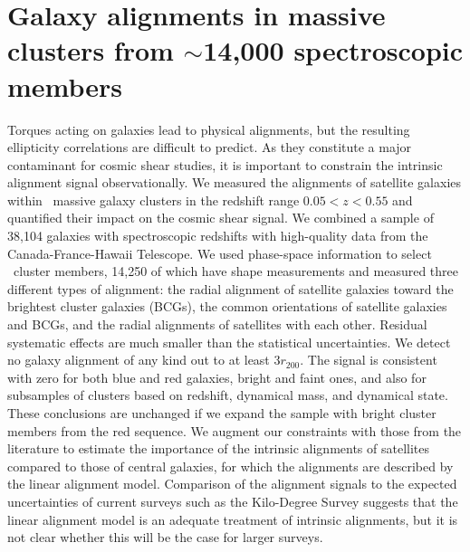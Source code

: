 \chapter{Galaxy alignments in massive clusters from $\sim$14,000 spectroscopic members}
\label{chapter:alignments}

\begin{small}
Torques acting on galaxies lead to physical alignments, but the resulting ellipticity correlations 
are difficult to  predict. As they constitute a major contaminant for cosmic shear studies, it is 
important to constrain the intrinsic alignment signal observationally. We measured the alignments 
of satellite galaxies within \Ncl\  massive galaxy clusters in the redshift range $0.05<z<0.55$ and 
quantified their impact on the cosmic shear signal. We combined a sample of 38,104 galaxies with 
spectroscopic redshifts with high-quality data from the Canada-France-Hawaii Telescope. We used 
phase-space information to select \Nmembers\ cluster members, 14,250 of which have shape 
measurements and measured three different types of alignment: the radial alignment of satellite 
galaxies toward the brightest cluster galaxies (BCGs), the common orientations of satellite 
galaxies and BCGs, and the radial alignments of satellites with each other. Residual systematic 
effects are much smaller than the statistical uncertainties. We detect no galaxy alignment of any 
kind out to at least $3r_{200}$. The signal is consistent with zero for both blue and red galaxies, 
bright and faint ones, and also for subsamples of clusters based on redshift, dynamical mass, and 
dynamical state. These conclusions are unchanged if we expand the sample with bright cluster 
members from the red sequence. We augment our constraints with those from the literature to 
estimate the importance of the intrinsic alignments of satellites compared to those of central 
galaxies, for which the alignments are described by the linear alignment model. Comparison of the 
alignment signals to the expected uncertainties of current surveys such as the Kilo-Degree Survey 
suggests that the linear alignment model is an adequate treatment of intrinsic alignments, but it 
is not clear whether this will be the case for larger surveys.
\end{small}

